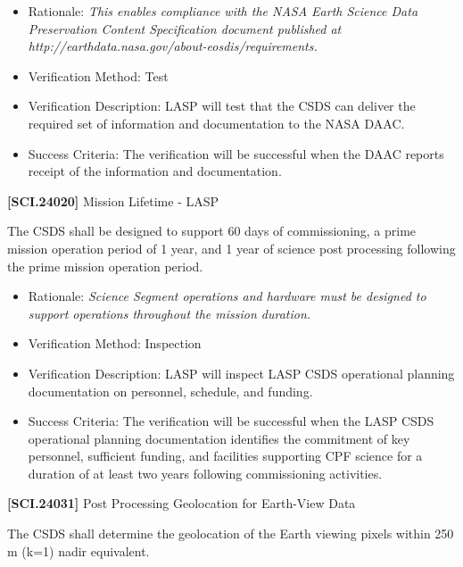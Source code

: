 \documentclass[12pt,oneside,oldfontcommands]{memoir}
\begin{document}
\begin{itemize}
\item{} Rationale: \emph{This enables compliance with the NASA Earth Science Data Preservation Content Specification document published at http:\slash \slash earthdata.nasa.gov\slash about-eosdis\slash requirements.}

\item{} Verification Method: Test

\item{} Verification Description: \gls{LASP} will \gls{test} that the \gls{CSDS} can deliver the required set of information and documentation to the NASA \gls{DAAC}.

\item{} Success Criteria: The verification will be successful when the \gls{DAAC} reports receipt of the information and documentation.

\end{itemize}

\textbf{[SCI.24020]} Mission Lifetime - \gls{LASP}

The \gls{CSDS} shall be designed to support 60 days of commissioning, a prime mission operation period of 1 year, and 1 year of science post processing following the prime mission operation period.

\begin{itemize}
\item{} Rationale: \emph{Science Segment operations and hardware must be designed to support operations throughout the mission duration.}

\item{} Verification Method: Inspection

\item{} Verification Description: \gls{LASP} will inspect \gls{LASP} \gls{CSDS} operational planning documentation on personnel, schedule, and funding.

\item{} Success Criteria: The verification will be successful when the \gls{LASP} \gls{CSDS} operational planning documentation identifies the commitment of key personnel, sufficient funding, and facilities supporting \gls{CPF} science for a duration of at least two years following commissioning activities.

\end{itemize}

\textbf{[SCI.24031]} Post Processing Geolocation for Earth-View Data

The \gls{CSDS} shall determine the geolocation of the Earth viewing pixels within 250 m (k=1) nadir equivalent.
\end{document}
